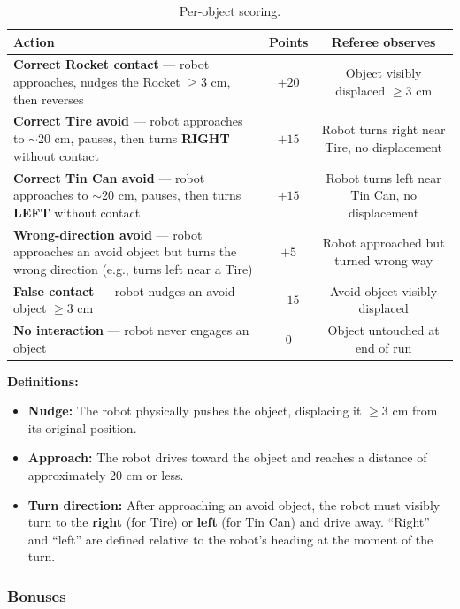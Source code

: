 \documentclass[a4]{article}
\begin{document}
\begin{table}[H]
\centering
\begin{tabular}{p{5.5cm}cc}
\toprule
\textbf{Action} & \textbf{Points} & \textbf{Referee observes} \\
\midrule
\textbf{Correct Rocket contact} --- robot approaches, nudges the Rocket $\geq$3 cm, then reverses & $+20$ & Object visibly displaced $\geq$3 cm \\
\addlinespace
\textbf{Correct Tire avoid} --- robot approaches to $\sim$20 cm, pauses, then turns \textbf{RIGHT} without contact & $+15$ & Robot turns right near Tire, no displacement \\
\addlinespace
\textbf{Correct Tin Can avoid} --- robot approaches to $\sim$20 cm, pauses, then turns \textbf{LEFT} without contact & $+15$ & Robot turns left near Tin Can, no displacement \\
\addlinespace
\textbf{Wrong-direction avoid} --- robot approaches an avoid object but turns the wrong direction (e.g., turns left near a Tire) & $+5$ & Robot approached but turned wrong way \\
\addlinespace
\textbf{False contact} --- robot nudges an avoid object $\geq$3 cm & $-15$ & Avoid object visibly displaced \\
\addlinespace
\textbf{No interaction} --- robot never engages an object & $0$ & Object untouched at end of run \\
\bottomrule
\end{tabular}
\caption{Per-object scoring.}
\end{table}

\textbf{Definitions:}
\begin{itemize}
    \item \textbf{Nudge:} The robot physically pushes the object, displacing it $\geq$3 cm from its original position.
    \item \textbf{Approach:} The robot drives toward the object and reaches a distance of approximately 20 cm or less.
    \item \textbf{Turn direction:} After approaching an avoid object, the robot must visibly turn to the \textbf{right} (for Tire) or \textbf{left} (for Tin Can) and drive away. ``Right'' and ``left'' are defined relative to the robot's heading at the moment of the turn.
\end{itemize}

\subsubsection*{Bonuses}
\end{document}
